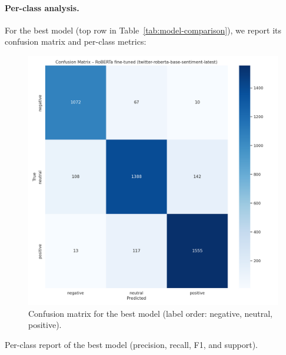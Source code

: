 \documentclass[10pt]{article}
\begin{document}
\paragraph{Per-class analysis.}
For the best model (top row in Table~\ref{tab:model-comparison}), we report its confusion matrix and per-class metrics:
\begin{figure}[H]
  \centering
  \includegraphics[width=.80\linewidth]{../SCRITPS/artifacts/figures/best_model_cm.png}
  \caption{Confusion matrix for the best model (label order: negative, neutral, positive).}
  \label{fig:best-confusion}
\end{figure}

\begin{table}[H]
  \centering
  \caption{Per-class report of the best model (precision, recall, F1, and support).}
  \label{tab:best-class-report}
  
\end{table}
\end{document}
